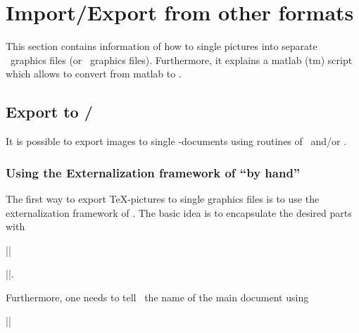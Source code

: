 \section{Import/Export from other formats}
\label{sec:pgfplots:importexport}
This section contains information of how to single pictures into separate \pdf\ graphics files (or \eps\ graphics files). Furthermore, it explains a matlab (tm) script which allows to convert from matlab to \PGFPlots.

\subsection[Export to pdf/eps]{Export to {\normalfont\pdf/\eps}}
It is possible to export images to single \pdf-documents using routines of \pgfname\ and/or \Tikz.

\subsubsection[Using the Externalization framework of pgf by hand]{Using the Externalization framework of {\normalfont\pgfname} ``by hand''}
The first way to export \TeX-pictures to single graphics files is to use the externalization framework of \pgfname.
The basic idea is to encapsulate the desired parts with

|\beginpgfgraphicnamed|


|\endpgfgraphicnamed|. 

\noindent Furthermore, one needs to tell \pgfname\ the name of the main document using

|\pgfrealjobname|

